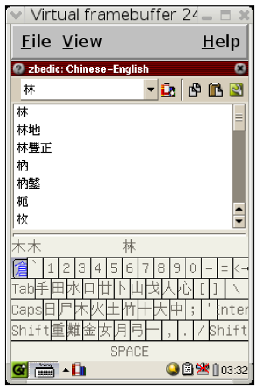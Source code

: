 \documentclass[12pt,a4paper]{article}
\begin{document}
\begin{CJK}{UTF8}{cwmu}
\begin{figure}[htbp]
\centering
\includegraphics[scale=0.9]{eps/changjei.eps}%
\hspace{1in}%

\end{figure}
\end{CJK}
\end{document}
